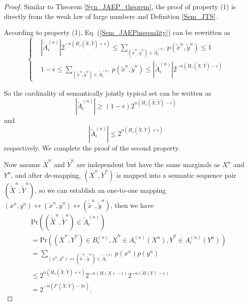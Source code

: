 \documentclass[12pt, draftclsnofoot,onecolumn]{IEEEtran}
\begin{document}
\begin{proof}
Similar to Theorem \ref{Syn_JAEP_theorem}, the proof of property (1) is directly from the weak law of large numbers and Definition \ref{Sem_JTS}.

According to property (1), Eq. (\ref{Sem_JAEPinequality}) can be rewritten as
\begin{equation}
\left\{ \begin{aligned}
&\left|\tilde{A}_{\epsilon}^{(n)}\right| 2^{-n\left(H_s(\tilde{X},\tilde{Y})+\epsilon\right)}\leq \sum_{(\tilde{x}^n,\tilde{y}^n) \in \tilde{A}_{\epsilon}^{(n)}} p\left(\tilde{x}^n,\tilde{y}^n\right)\leq 1\\
&1-\epsilon \leq \sum_{(\tilde{x}^n,\tilde{y}^n)\in \tilde{A}_{\epsilon}^{(n)}} p\left(\tilde{x}^n,\tilde{y}^n\right) \leq \left|\tilde{A}_{\epsilon}^{(n)}\right| 2^{-n\left(H_s(\tilde{X},\tilde{Y})-\epsilon\right)}
\end{aligned}\right.
\end{equation}

So the cardinality of semantically jointly typical set can be written as
\begin{equation}\label{equation_SJTS_down}
\left|\tilde{A}_{\epsilon}^{(n)}\right| \geq \left(1-\epsilon\right) 2^{n\left(H_s(\tilde{X},\tilde{Y})-\epsilon\right)}
\end{equation}
and
\begin{equation}\label{equation_SJTS_up}
\left|\tilde{A}_{\epsilon}^{(n)}\right| \leq 2^{n\left(H_s(\tilde{X},\tilde{Y})+\epsilon\right)}
\end{equation}
respectively. We complete the proof of the second property.

Now assume $\dot{X}^n$ and $\dot{Y}^n$ are independent but have the same marginals as $X^n$ and $Y^n$, and after de-mapping, $(\dot{X}^n,\dot{Y}^n)$ is mapped into a semantic sequence pair $(\dot{\tilde{X}}^n,\dot{\tilde{Y}}^n)$, so we can establish an one-to-one mapping $(x^n,y^n) \leftrightarrow (\dot{x}^n,\dot{y}^n) \leftrightarrow (\dot{\tilde{x}}^n,\dot{\tilde{y}}^n)$, then we have
\begin{equation}
\begin{aligned}
&\text{Pr}\left((\dot{\tilde{X}}^n,\dot{\tilde{Y}}^n)\in \tilde{A}_{\epsilon}^{(n)}\right) \\
&=\text{Pr}\left((\dot{X}^n,\dot{Y}^n)\in B_{\epsilon}^{(n)},\dot{X}^n\in A_{\epsilon}^{(n)}(X^n),\dot{Y}^n\in A_{\epsilon}^{(n)}(Y^n)\right)\\
&= \sum_{ (x^n,y^n) \leftrightarrow (\dot{\tilde{x}}^n,\dot{\tilde{y}}^n)\in \tilde{A}_{\epsilon}^{(n)}} p(x^n)p(y^n)\\
&\leq 2^{n\left(H_s(\tilde{X},\tilde{Y})+\epsilon\right)}2^{-n\left(H(X)-\epsilon\right)}2^{-n\left(H(Y)-\epsilon\right)}\\
&= 2^{-n\left(I^s(\tilde{X},\tilde{Y})-3\epsilon\right)}.
\end{aligned}
\end{equation}


\end{proof}
\end{document}
